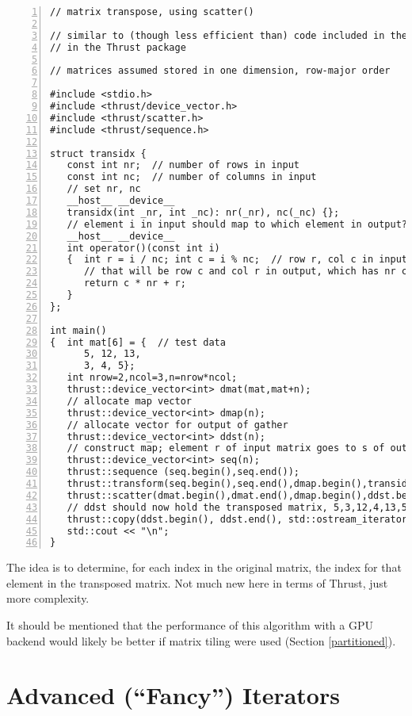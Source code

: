 \begin{lstlisting}[numbers=left]
// matrix transpose, using scatter()

// similar to (though less efficient than) code included in the examples
// in the Thrust package

// matrices assumed stored in one dimension, row-major order

#include <stdio.h>
#include <thrust/device_vector.h>
#include <thrust/scatter.h>
#include <thrust/sequence.h>

struct transidx {
   const int nr;  // number of rows in input
   const int nc;  // number of columns in input
   // set nr, nc
   __host__ __device__
   transidx(int _nr, int _nc): nr(_nr), nc(_nc) {};
   // element i in input should map to which element in output?
   __host__ __device__
   int operator()(const int i)
   {  int r = i / nc; int c = i % nc;  // row r, col c in input
      // that will be row c and col r in output, which has nr cols
      return c * nr + r;
   }
};

int main()
{  int mat[6] = {  // test data
      5, 12, 13,
      3, 4, 5};
   int nrow=2,ncol=3,n=nrow*ncol;
   thrust::device_vector<int> dmat(mat,mat+n);
   // allocate map vector
   thrust::device_vector<int> dmap(n);
   // allocate vector for output of gather
   thrust::device_vector<int> ddst(n);
   // construct map; element r of input matrix goes to s of output
   thrust::device_vector<int> seq(n);
   thrust::sequence (seq.begin(),seq.end());
   thrust::transform(seq.begin(),seq.end(),dmap.begin(),transidx(nrow,ncol));
   thrust::scatter(dmat.begin(),dmat.end(),dmap.begin(),ddst.begin());
   // ddst should now hold the transposed matrix, 5,3,12,4,13,5; check it:
   thrust::copy(ddst.begin(), ddst.end(), std::ostream_iterator<int>(std::cout, " "));
   std::cout << "\n";
}
\end{lstlisting}

The idea is to determine, for each index in the original matrix, the
index for that element in the transposed matrix.  Not much new here in
terms of Thrust, just more complexity.  

It should be mentioned that the performance of this algorithm with a GPU
backend would likely be better if matrix tiling were used (Section
\ref{partitioned}).

\section{Advanced (``Fancy'') Iterators}

